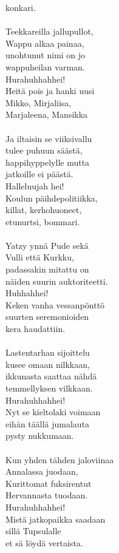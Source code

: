 konkari. \\ \hspace{10mm} \\ Teekkareilla jallupullot, \\ Wappu alkaa painaa, \\ unohtunut nimi on jo \\ wappuheilan varman. \\ Hurahuhhahhei! \\ Heitä pois ja hanki uusi \\ Mikko, Mirjaliisa, \\ Marjaleena, Mansikka \\ \hspace{10mm} \\ Ja iltaisin se viiksivallu \\ tulee puhuun säästä, \\ happihyppelylle mutta \\ jatkoille ei päästä. \\ Halleluujah hei! \\ Koulun päihdepolitiikka, \\ killat, kerhohuoneet, \\ etunurtsi, bommari. \\ \hspace{10mm} \\ Yatzy ynnä Pude sekä \\ Vulli että Kurkku, \\ padassakin mitattu on \\ näiden suurin auktoriteetti. \\ Huhhahhei! \\ Keken vanha vessanpönttö \\ suurten seremonioiden \\ kera haudattiin. \\ \hspace{10mm} \\ Lastentarhan sijoittelu \\ kusee omaan nilkkaan, \\ ikkunasta saattaa nähdä \\ temmellyksen vilkkaan. \\ Hurahuhhahhei! \\ Nyt se kieltolaki voimaan \\ eihän täällä jumalauta \\ pysty nukkumaan. \\ \hspace{10mm} \\ Kun yhden tähden jaloviinaa \\ Annalassa juodaan, \\ Kurittomat fuksirentut \\ Hervannasta tuodaan. \\ Hurahuhhahhei! \\ Mistä jatkopaikka saadaan \\ sillä Tupsulalle \\ et sä löydä vertaista.